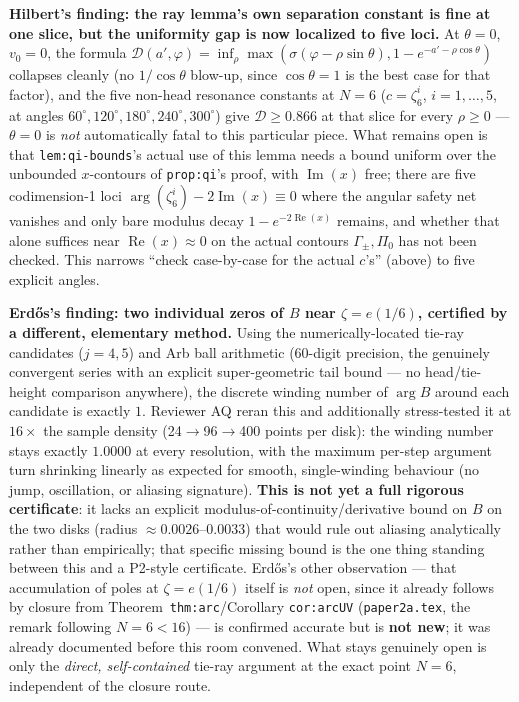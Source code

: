 \documentclass[11pt]{article}
\theoremstyle{plain}
\theoremstyle{remark}
\begin{document}
\textbf{Hilbert's finding: the ray lemma's own separation constant is fine at one slice, but the
uniformity gap is now localized to five loci.} At $\theta=0$, $v_0=0$, the formula
$\mathcal D(a',\varphi)=\inf_\rho\max(\sigma(\varphi-\rho\sin\theta),1-e^{-a'-\rho\cos\theta})$
collapses cleanly (no $1/\cos\theta$ blow-up, since $\cos\theta=1$ is the best case for that factor),
and the five non-head resonance constants at $N=6$ ($c=\zeta_6^i$, $i=1,\dots,5$, at angles
$60^\circ,120^\circ,180^\circ,240^\circ,300^\circ$) give $\mathcal D\ge0.866$ at that slice for every
$\rho\ge0$ --- $\theta=0$ is \emph{not} automatically fatal to this particular piece. What remains
open is that \texttt{lem:qi-bounds}'s actual use of this lemma needs a bound uniform over the
unbounded $x$-contours of \texttt{prop:qi}'s proof, with $\operatorname{Im}(x)$ free; there are five
codimension-1 loci $\arg(\zeta_6^i)-2\operatorname{Im}(x)\equiv0$ where the angular safety net
vanishes and only bare modulus decay $1-e^{-2\operatorname{Re}(x)}$ remains, and whether that alone
suffices near $\operatorname{Re}(x)\approx0$ on the actual contours $\Gamma_\pm,\Pi_0$ has not been
checked. This narrows ``check case-by-case for the actual $c$'s'' (above) to five explicit angles.

\textbf{Erd\H os's finding: two individual zeros of $B$ near $\zeta=e(1/6)$, certified by a different,
elementary method.} Using the numerically-located tie-ray candidates ($j=4,5$) and Arb ball
arithmetic (60-digit precision, the genuinely convergent series with an explicit super-geometric tail
bound --- no head/tie-height comparison anywhere), the discrete winding number of $\arg B$ around
each candidate is exactly $1$. Reviewer AQ reran this and additionally stress-tested it at $16\times$
the sample density (24$\to$96$\to$400 points per disk): the winding number stays exactly $1.0000$ at
every resolution, with the maximum per-step argument turn shrinking linearly as expected for smooth,
single-winding behaviour (no jump, oscillation, or aliasing signature). \textbf{This is not yet a
full rigorous certificate}: it lacks an explicit modulus-of-continuity/derivative bound on $B$ on the
two disks (radius $\approx0.0026$--$0.0033$) that would rule out aliasing analytically rather than
empirically; that specific missing bound is the one thing standing between this and a P2-style
certificate. Erd\H os's other observation --- that accumulation of poles at $\zeta=e(1/6)$ itself is
\emph{not} open, since it already follows by closure from Theorem~\texttt{thm:arc}/Corollary
\texttt{cor:arcUV} (\texttt{paper2a.tex}, the remark following $N=6<16$) --- is confirmed accurate
but is \textbf{not new}; it was already documented before this room convened. What stays genuinely
open is only the \emph{direct, self-contained} tie-ray argument at the exact point $N=6$, independent
of the closure route.
\end{document}
